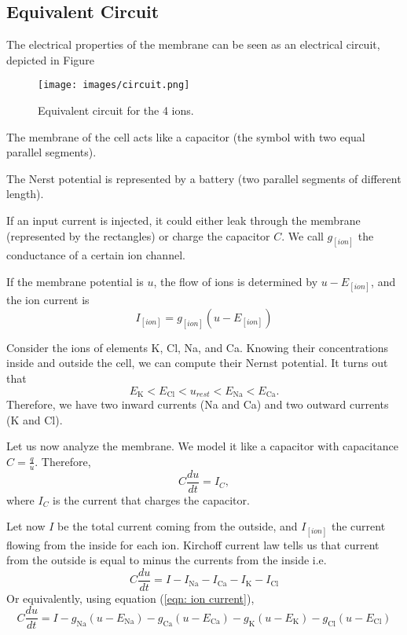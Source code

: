 \documentclass[oneside]{book}
\theoremstyle{definition}
\theoremstyle{plain}
\begin{document}
\subsection{Equivalent Circuit}

The electrical properties of the membrane can be seen as an electrical circuit, depicted in Figure 
\begin{figure}
    \centering
    \texttt{[image: images/circuit.png]}
    \caption{Equivalent circuit for the 4 ions.}
    \label{fig:circuit}
\end{figure}
The membrane of the cell acts like a capacitor (the symbol with two equal parallel segments).

The Nerst potential is represented by a battery (two parallel segments of different length). 

If an input current is injected, it could either leak through the membrane (represented by the rectangles) or charge the capacitor $C$. 
We call $g_{[ion]}$ the conductance of a certain ion channel. 

If the membrane potential is $u$, the flow of ions is determined by $u-E_{[ion]}$, and the ion current is
\begin{equation}
    \label{eqn: ion current}
    I_{[ion]} = g_{[ion]} (u-E_{[ion]})
\end{equation}

Consider the ions of elements K, Cl, Na, and Ca.
Knowing their concentrations inside and outside the cell, we can compute their Nernst potential. 
It turns out that
\[
    E_{\mathrm{K}} <E_{\mathrm{Cl}}<u_{rest}<E_{\mathrm{Na}}<E_{\mathrm{Ca}}.
\]
Therefore, we have two inward currents (Na and Ca) and two outward currents (K and Cl).

Let us now analyze the membrane. We model it like a capacitor with capacitance $C=\frac{q}{u}$. Therefore,
\[
    C \frac{du}{dt} =I_C,
\]
where $I_C$ is the current that charges the capacitor.

Let now $I$  be the total current coming from the outside, and $I_{[ion]}$ the current flowing from the inside for each ion.
Kirchoff current law tells us that current from the outside is equal to minus the currents from the inside i.e.
\begin{equation}
    \label{eqn:kichoff}
    C \frac{du}{dt} = I- I_{\mathrm{Na}} - I_{\mathrm{Ca}} - I_{\mathrm{K}} - I_{\mathrm{Cl}}
\end{equation}
Or equivalently, using equation (\ref{eqn: ion current}), 
\begin{equation}
    \label{eqn:kirchoff2}
    C\frac{du}{dt}=I-g_{\mathrm{Na}} (u-E_{\mathrm{Na}})
     -g_{\mathrm{Ca}} (u-E_{\mathrm{Ca}})
     - g_{\mathrm{K}} (u-E_{\mathrm{K}})
     - g_{\mathrm{Cl}} (u-E_{\mathrm{Cl}})
\end{equation}
\end{document}
